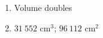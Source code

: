 {\begin{multicols}{3}
\begin{enumerate}[noitemsep, label=\textbf{\arabic*}. ] 
 \item Volume doubles%
\setcounter{enumi}{2}
\item $31~552$ cm$^3$; $96~112$ cm$^2$ %
\end{enumerate}


\end{multicols}}
